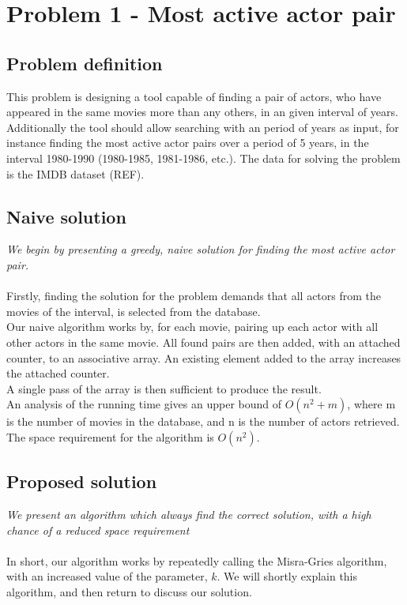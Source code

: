 \section{Problem 1 - Most active actor pair}


\subsection{Problem definition}
\label{defintion}
This problem is designing a tool capable of finding a pair of actors, who have appeared in the same movies more than any others, in an given interval of years.
Additionally the tool should allow searching with an period of years as input, for instance finding the most active actor pairs over a period of 5 years, in the interval 1980-1990 (1980-1985, 1981-1986, etc.).
The data for solving the problem is the IMDB dataset (REF). 

\subsection{Naive solution}
\label{naive}
\emph{We begin by presenting a greedy, naive solution for finding the most active actor pair.} \\ \\
Firstly, finding the solution for the problem demands that all actors from the movies of the interval, is selected from the database. \\
Our naive algorithm works by, for each movie, pairing up each actor with all other actors in the same movie. All found pairs are then added, with an attached counter, to an associative array. An existing element added to the array increases the attached counter. \\
A single pass of the array is then sufficient to produce the result. \\

An analysis of the running time gives an upper bound of $O(n^2 + m)$, where m is the number of movies in the database, and n is the number of actors retrieved. \\
The space requirement for the algorithm is $O(n^2)$.

\subsection{Proposed solution}
\label{proposed}
\emph{We present an algorithm which always find the correct solution, with a high chance of a reduced space requirement} \\ \\
In short, our algorithm works by repeatedly calling the Misra-Gries algorithm, with an increased value of the parameter, $k$. We will shortly explain this algorithm, and then return to discuss our solution.

